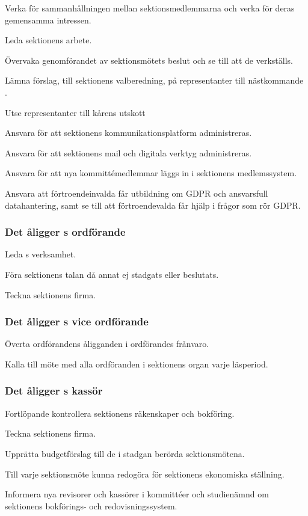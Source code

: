 \begin{att}
	\item Verka för sammanhållningen mellan sektionsmedlemmarna och verka för deras gemensamma intressen.
	\item Leda sektionens arbete.
	\item Övervaka genomförandet av sektionsmötets beslut och se till att de verkställs.
	\item Lämna förslag, till sektionens valberedning, på representanter till nästkommande \STYRIT.
	\item Utse representanter till kårens utskott
	\item Ansvara för att sektionens kommunikationsplatform administreras.
	\item Ansvara för att sektionens mail och digitala verktyg administreras.
	\item Ansvara för att nya kommittémedlemmar läggs in i sektionens medlemssystem.
	\item Ansvara att förtroendeinvalda får utbildning om GDPR och ansvarsfull datahantering, samt se till att förtroendevalda får hjälp i frågor som rör GDPR.
\end{att}

\subsubsection{Det åligger \STYRIT{}s ordförande}
\begin{att}
	\item Leda \STYRIT{}s verksamhet.
	\item Föra sektionens talan då annat ej stadgats eller beslutats.
	\item Teckna sektionens firma.
\end{att}

\subsubsection{Det åligger \STYRIT{}s vice ordförande}
\begin{att}
	\item Överta ordförandens åligganden i ordförandes frånvaro.
	\item Kalla till möte med alla ordföranden i sektionens organ varje läsperiod.
\end{att}

\subsubsection{Det åligger \STYRIT{}s kassör}
\begin{att}
	\item Fortlöpande kontrollera sektionens räkenskaper och bokföring.
	\item Teckna sektionens firma.
	\item Upprätta budgetförslag till de i stadgan berörda sektionsmötena.
	\item Till varje sektionsmöte kunna redogöra för sektionens ekonomiska ställning.
	\item Informera nya revisorer och kassörer i kommittéer och studienämnd om sektionens bokförings- och redovisningssystem.
\end{att}

